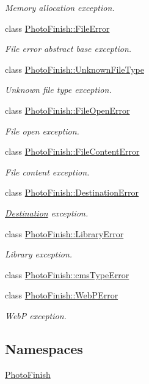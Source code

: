 \begin{DoxyCompactItemize}
\begin{DoxyCompactList}\small\item\em Memory allocation exception. \end{DoxyCompactList}\item 
class \hyperlink{class_photo_finish_1_1_file_error}{Photo\+Finish\+::\+File\+Error}
\begin{DoxyCompactList}\small\item\em File error abstract base exception. \end{DoxyCompactList}\item 
class \hyperlink{class_photo_finish_1_1_unknown_file_type}{Photo\+Finish\+::\+Unknown\+File\+Type}
\begin{DoxyCompactList}\small\item\em Unknown file type exception. \end{DoxyCompactList}\item 
class \hyperlink{class_photo_finish_1_1_file_open_error}{Photo\+Finish\+::\+File\+Open\+Error}
\begin{DoxyCompactList}\small\item\em File open exception. \end{DoxyCompactList}\item 
class \hyperlink{class_photo_finish_1_1_file_content_error}{Photo\+Finish\+::\+File\+Content\+Error}
\begin{DoxyCompactList}\small\item\em File content exception. \end{DoxyCompactList}\item 
class \hyperlink{class_photo_finish_1_1_destination_error}{Photo\+Finish\+::\+Destination\+Error}
\begin{DoxyCompactList}\small\item\em \hyperlink{class_photo_finish_1_1_destination}{Destination} exception. \end{DoxyCompactList}\item 
class \hyperlink{class_photo_finish_1_1_library_error}{Photo\+Finish\+::\+Library\+Error}
\begin{DoxyCompactList}\small\item\em Library exception. \end{DoxyCompactList}\item 
class \hyperlink{class_photo_finish_1_1cms_type_error}{Photo\+Finish\+::cms\+Type\+Error}
\item 
class \hyperlink{class_photo_finish_1_1_web_p_error}{Photo\+Finish\+::\+Web\+P\+Error}
\begin{DoxyCompactList}\small\item\em WebP exception. \end{DoxyCompactList}\end{DoxyCompactItemize}
\subsection*{Namespaces}
\begin{DoxyCompactItemize}
\item 
 \hyperlink{namespace_photo_finish}{Photo\+Finish}
\end{DoxyCompactItemize}
